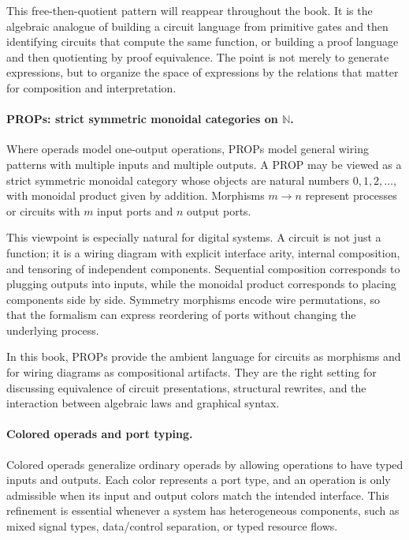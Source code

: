 \documentclass[11pt]{article}
\begin{document}
This free-then-quotient pattern will reappear throughout the book. It is the algebraic analogue of building a circuit language from primitive gates and then identifying circuits that compute the same function, or building a proof language and then quotienting by proof equivalence. The point is not merely to generate expressions, but to organize the space of expressions by the relations that matter for composition and interpretation.

\paragraph{PROPs: strict symmetric monoidal categories on \(\mathbb{N}\).}
Where operads model one-output operations, PROPs model general wiring patterns with multiple inputs and multiple outputs. A PROP may be viewed as a strict symmetric monoidal category whose objects are natural numbers \(0,1,2,\dots\), with monoidal product given by addition. Morphisms \(m \to n\) represent processes or circuits with \(m\) input ports and \(n\) output ports.

This viewpoint is especially natural for digital systems. A circuit is not just a function; it is a wiring diagram with explicit interface arity, internal composition, and tensoring of independent components. Sequential composition corresponds to plugging outputs into inputs, while the monoidal product corresponds to placing components side by side. Symmetry morphisms encode wire permutations, so that the formalism can express reordering of ports without changing the underlying process.

In this book, PROPs provide the ambient language for circuits as morphisms and for wiring diagrams as compositional artifacts. They are the right setting for discussing equivalence of circuit presentations, structural rewrites, and the interaction between algebraic laws and graphical syntax.

\paragraph{Colored operads and port typing.}
Colored operads generalize ordinary operads by allowing operations to have typed inputs and outputs. Each color represents a port type, and an operation is only admissible when its input and output colors match the intended interface. This refinement is essential whenever a system has heterogeneous components, such as mixed signal types, data/control separation, or typed resource flows.
\end{document}
